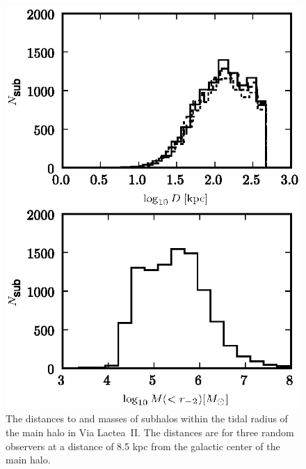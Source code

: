 \documentclass[aps,prd,twocolumn,amsmath,amssymb,floatfix,nofootinbib,10pt]{revtex4}
\newcommand{\VL}{Via Lactea}
\begin{document}
\begin{figure}
\centering
\includegraphics{hist_-2_-3_10_1.eps}
\caption{The distances to and masses of subhalos within the tidal
radius of the main halo in \VL\ II. The distances are for three random
observers at a distance of 8.5 kpc from the galactic center of the
main halo.}%
\label{fig:VL23_1}%
\end{figure}
\end{document}
